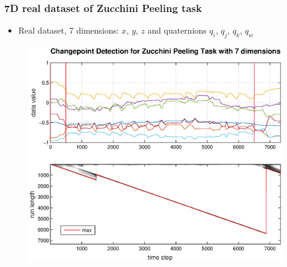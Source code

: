 \documentclass{beamer} %
\begin{document}
\begin{frame}
\frametitle{7D real dataset of Zucchini Peeling task}
\begin{itemize}
\item Real dataset, 7 dimensions: $x$, $y$, $z$ and quaternions $q_i$, $q_j$, $q_k$, $q_w$
\end{itemize}
\begin{figure}
\centering
\includegraphics[height=.8\textheight]{proc2_7dim.eps}
\end{figure}
\vfill
\end{frame}
\end{document}
